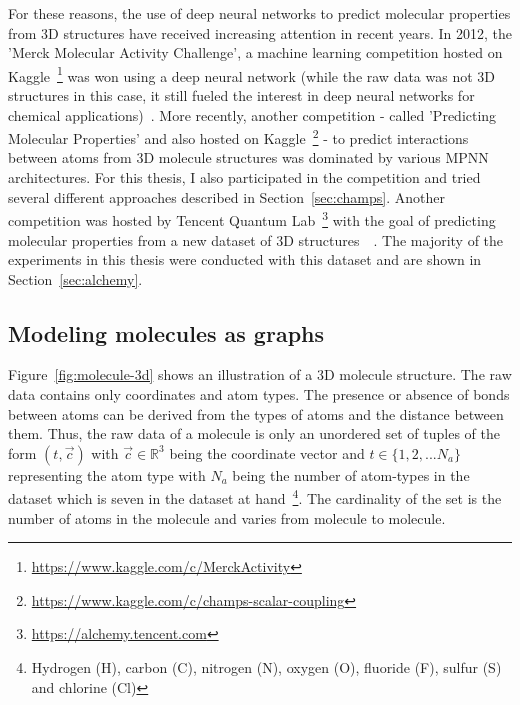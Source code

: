 For these reasons, the use of deep neural networks to predict molecular properties from 3D structures have received increasing attention in recent years. In 2012, the 'Merck Molecular Activity Challenge', a machine learning competition hosted on Kaggle~\footnote{\url{https://www.kaggle.com/c/MerckActivity}} was won using a deep neural network (while the raw data was not 3D structures in this case, it still fueled the interest in deep neural networks for chemical applications)~\cite{Ma2015}. More recently, another competition - called 'Predicting Molecular Properties' and also hosted on Kaggle~\footnote{\url{https://www.kaggle.com/c/champs-scalar-coupling}} - to predict interactions between atoms from 3D molecule structures was dominated by various MPNN architectures. For this thesis, I also participated in the competition and tried several different approaches described in Section~\ref{sec:champs}. Another competition was hosted by Tencent Quantum Lab~\footnote{\url{https://alchemy.tencent.com}} with the goal of predicting molecular properties from a new dataset of 3D structures~\cite{Chen2019}~\cite{Klicpera2019}. The majority of the experiments in this thesis were conducted with this dataset and are shown in Section~\ref{sec:alchemy}.


\subsection{Modeling molecules as graphs}
\label{sec:molecules-as-graphs}

Figure~\ref{fig:molecule-3d} shows an illustration of a 3D molecule structure. The raw data contains only coordinates and atom types. The presence or absence of bonds between atoms can be derived from the types of atoms and the distance between them. Thus, the raw data of a molecule is only an unordered set of tuples of the form $(t, \vec{c})$
with $\vec{c} \in \mathbb{R}^3$ being the coordinate vector
and $t \in \{1, 2, ... N_a\} $ representing the atom type with $N_a$ being the number of atom-types in the dataset which is seven in the dataset at hand~\footnote{
	Hydrogen (H), carbon (C), nitrogen (N), oxygen (O), fluoride (F), sulfur (S) and chlorine (Cl)
}. The cardinality of the set is the number of atoms in the molecule and varies from molecule to molecule.

